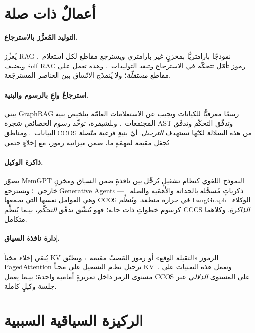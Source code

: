 \documentclass[11pt]{article}
\begin{document}
\section{أعمالٌ ذات صلة}\label{sec:related}

\paragraph{التوليد المُعزَّز بالاسترجاع.} يُعزِّز RAG نموذجًا بارامتريًّا بمخزنٍ غير
بارامتري ويسترجع مقاطع لكل استعلام~\cite{lewis2020rag}. ويضيف Self-RAG رموز تأمّل تتحكّم
في الاسترجاع وتنقد التوليدات~\cite{asai2023selfrag}. وهذه تعمل على مقاطع \emph{مستقلّة}؛
ولا يُنمذَج الاتّساق بين العناصر المسترجَعة.

\paragraph{استرجاعٌ واعٍ بالرسوم والبنية.} يبني GraphRAG رسمًا معرفيًّا للكيانات ويجيب عن
الاستعلامات العامّة بتلخيص بنية المجتمعات~\cite{edge2024graphrag}. وللشيفرة، توحِّد رسوم
الخصائص شجرة AST وتدفّق التحكّم وتدفّق البيانات~\cite{yamaguchi2014cpg}. ومناطق CCOS من
هذه السلالة لكنّها تستهدف \emph{الترحيل}: أيّ بنيةٍ فرعية متّصلة تُجعَل مقيمة لمهمّةٍ ما،
ضمن ميزانية رموز، مع إخلاءٍ حتمي.

\paragraph{ذاكرة الوكيل.} يصوّر MemGPT النموذج اللغوي كنظام تشغيلٍ يُرحِّل بين نافذةٍ ضمن
السياق ومخزنٍ خارجي~\cite{packer2023memgpt}؛ ويسترجع Generative Agents ذكرياتٍ مُسجَّلة
بالحداثة والأهمّية والصلة~\cite{park2023generative} --- وهي العوامل نفسها التي يجمعها CCOS
في حرارة منطقة. ويُنظِّم LangGraph~\cite{langgraph} الوكلاء كرسوم خطواتٍ ذات حالة؛ فهو
يُنسِّق تدفّق \emph{التحكّم}، بينما يُنظِّم CCOS \emph{الذاكرة}. وكلاهما متكامل.

\paragraph{إدارة نافذة السياق.} يُبقي إخلاء مخبأ KV الرموز «الثقيلة الوقع» أو رموز
المَصبّ مقيمة~\cite{liu2023lost}، ويطبّق PagedAttention ترحيل نظام التشغيل على مخبأ
KV~\cite{kwon2023paged}. وتعمل هذه التقنيات على مستوى الرمز داخل تمريرةٍ أمامية واحدة؛
بينما يعمل CCOS على المستوى \emph{الدلالي} عبر جلسة وكيلٍ كاملة.

\section{الركيزة السياقية السببية}\label{sec:substrate}
\end{document}
